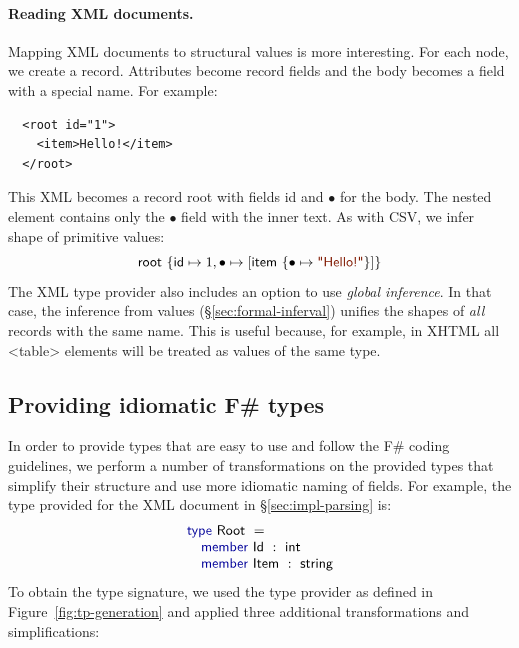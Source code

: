 \documentclass[10pt]{sigplanconf}
\newcommand{\kvd}[1]{\textnormal{\textcolor{kvdclr}{\sffamily #1}}}
\newcommand{\str}[1]{\textnormal{\textcolor{strclr}{\sffamily "#1"}}}
\newcommand{\ident}[1]{\textnormal{\sffamily #1}}
\begin{document}
\paragraph{Reading XML documents.}
Mapping XML documents to structural values is more interesting. For each node, we
create a record. Attributes become record fields and the body becomes a field with a special
name. For example:
%
{\small{
\begin{verbatim}
  <root id="1">
    <item>Hello!</item>
  </root>
\end{verbatim}
}}
%
\noindent
This XML becomes a record \ident{root} with fields \ident{id} and $\bullet$ for the body.
The nested element contains only the $\bullet$ field with the inner text. As with CSV, we
infer shape of primitive values:
%
\begin{equation*}
\ident{root}~\{ \ident{id} \mapsto 1, \bullet \mapsto [ \ident{item}~\{ \bullet \mapsto \str{Hello!} \}] \}
\end{equation*}
%
The XML type provider also includes an option to use \emph{global inference}. In that case,
the inference from values (\S\ref{sec:formal-inferval}) unifies the shapes of \emph{all} records with the
same name. This is useful because, for example, in XHTML all {\small\ttfamily <table>} elements
will be treated as values of the same type.


\subsection{Providing idiomatic F\# types}
\label{sec:impl-naming}

In order to provide types that are easy to use and follow the F\# coding guidelines,
we perform a number of transformations on the provided types that simplify their structure
and use more idiomatic naming of fields. For example, the type provided for the XML document in
\S\ref{sec:impl-parsing} is:
%
\begin{equation*}
\begin{array}{l}
 \kvd{type}~\ident{Root}~=  \\
 \quad \kvd{member}~\ident{Id}~:~\ident{int} \\
 \quad \kvd{member}~\ident{Item}~:~\ident{string}
\end{array}
\end{equation*}
%
To obtain the type signature, we used the type provider as defined in Figure~\ref{fig:tp-generation}
and applied three additional transformations and simplifications:
\end{document}
